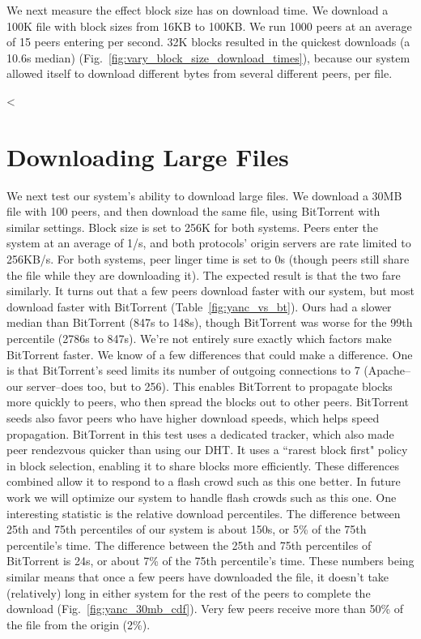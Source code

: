 We next measure the effect block size has on download time. We download a 100K file with block sizes from 
16KB to 100KB. We run 1000 peers at an average of 15 peers entering per second. 32K blocks resulted 
in the quickest downloads (a 10.6s median) (Fig.~\ref{fig:vary_block_size_download_times}), because our system
allowed itself to download different bytes from several different peers, per file.


<%

\section{Downloading Large Files}

We next test our system's ability to download large files. We download a 30MB file with 100 peers, 
and then download the same file, using BitTorrent with similar 
settings. Block size is set to 256K for both systems. Peers enter the system at an average of 1/s, 
and both protocols' origin servers are rate limited to 256KB/s. For both systems, peer linger time 
is set to 0s (though peers still share the file while they are downloading it). 
The expected result is that the two fare similarly. It turns out that a few peers download 
faster with our system, but most download faster with BitTorrent (Table~\ref{fig:yanc_vs_bt}). 
Ours had a slower median than BitTorrent (847s to 148s), though BitTorrent was worse for the 99th 
percentile (2786s to 847s). We're not entirely sure exactly which factors make BitTorrent faster.
We know of a few differences that could make a difference.  One is that BitTorrent's seed limits its number of outgoing connections
to 7 (Apache--our server--does too, but to 256). This enables BitTorrent to propagate blocks more 
quickly to peers, who then spread the blocks out to other peers. BitTorrent seeds also favor peers who have higher download 
speeds, which helps speed propagation. BitTorrent in this test uses a dedicated tracker, 
which also made peer rendezvous quicker than using our DHT.  It uses a ``rarest block first" policy in block 
selection, enabling it to share blocks more efficiently.  These differences combined allow it 
to respond to a flash crowd such as this one better.  In future work we will optimize our system to handle 
flash crowds such as this one.  One interesting statistic is the relative download percentiles. 
The difference between 25th and 75th percentiles of our system is about 150s, 
or 5\% of the 75th percentile's time. The difference between the 25th and 75th percentiles of BitTorrent 
is 24s, or about 7\% of the 75th percentile's time. These numbers being similar means that once 
a few peers have downloaded the file, it doesn't take (relatively) long in either system for the rest of the peers to complete 
the download (Fig.~\ref{fig:yanc_30mb_cdf}). Very few peers receive more than 50\% of the file 
from the origin (2\%). 

